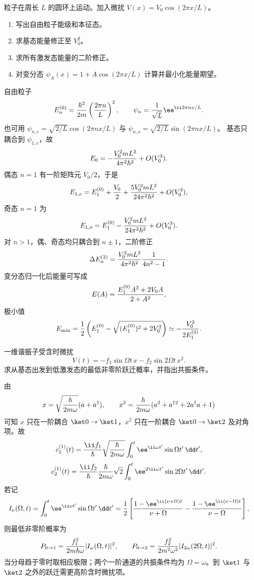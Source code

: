 
\begin{question}
粒子在周长 $L$ 的圆环上运动。加入微扰 $V(x)=V_0\cos(2\pi x/L)$。
\begin{enumerate}
  \item 写出自由粒子能级和本征态。
  \item 求基态能量修正至 $V_0^2$。
  \item 求所有激发态能量的二阶修正。
  \item 对变分态 $\psi_A(x)=1+A\cos(2\pi x/L)$ 计算并最小化能量期望。
\end{enumerate}
\begin{solution}
自由粒子
\[
  E_n^{(0)}={\hbar^2\over2m}\left({2\pi n\over L}\right)^2,\qquad
  \psi_n={1\over\sqrt L}\ee^{\ii2\pi nx/L}.
\]
也可用 $\psi_{n,e}=\sqrt{2/L}\cos(2\pi nx/L)$ 与 $\psi_{n,o}=\sqrt{2/L}\sin(2\pi nx/L)$。
基态只耦合到 $\psi_{1,e}$，故
\[
  E_0=-{V_0^2mL^2\over4\pi^2\hbar^2}+O(V_0^3).
\]
偶态 $n=1$ 有一阶矩阵元 $V_0/2$，于是
\[
  E_{1,e}=E_1^{(0)}+{V_0\over2}+{5V_0^2mL^2\over24\pi^2\hbar^2}+O(V_0^3),
\]
奇态 $n=1$ 为
\[
  E_{1,o}=E_1^{(0)}-{V_0^2mL^2\over24\pi^2\hbar^2}+O(V_0^3).
\]
对 $n>1$，偶、奇态均只耦合到 $n\pm1$，二阶修正
\[
  \Delta E_n^{(2)}={V_0^2mL^2\over4\pi^2\hbar^2}{1\over4n^2-1}.
\]
变分态归一化后能量可写成
\[
  E(A)={E_1^{(0)}A^2+2V_0A\over2+A^2},
\]
极小值
\[
  E_{\min}={1\over2}\left(E_1^{(0)}-\sqrt{(E_1^{(0)})^2+2V_0^2}\right)
  \simeq-{V_0^2\over2E_1^{(0)}}.
\]
\end{solution}
\end{question}

\begin{question}
一维谐振子受含时微扰
\[
  V(t)=-f_1\sin\Omega t\,x-f_2\sin2\Omega t\,x^2.
\]
求从基态出发到低激发态的最低非零阶跃迁概率，并指出共振条件。
\begin{solution}
由
\[
  x=\sqrt{\hbar\over2m\omega}(a+a^\dagger),\qquad
  x^2={\hbar\over2m\omega}(a^2+a^{\dagger2}+2a^\dagger a+1)
\]
可知 $x$ 只在一阶耦合 $\ket0\to\ket1$，$x^2$ 只在一阶耦合 $\ket0\to\ket2$ 及对角项。故
\[
  c_1^{(1)}(t)={\ii f_1\over\hbar}\sqrt{\hbar\over2m\omega}
  \int_0^t \ee^{\ii\omega t'}\sin\Omega t'\,\dd t',
\]
\[
  c_2^{(1)}(t)={\ii f_2\over\hbar}{\hbar\over2m\omega}\sqrt2
  \int_0^t \ee^{2\ii\omega t'}\sin2\Omega t'\,\dd t' .
\]
若记
\[
  I_\nu(\Omega,t)=\int_0^t \ee^{\ii\nu t'}\sin\Omega t'\,\dd t'
  ={1\over2}\left[
  {1-\ee^{\ii(\nu+\Omega)t}\over \nu+\Omega}
  -{1-\ee^{\ii(\nu-\Omega)t}\over \nu-\Omega}\right],
\]
则最低非零阶概率为
\[
  P_{0\to1}={f_1^2\over 2m\hbar\omega}|I_\omega(\Omega,t)|^2,\qquad
  P_{0\to2}={f_2^2\over 2m^2\omega^2}|I_{2\omega}(2\Omega,t)|^2 .
\]
当分母趋于零时取相应极限；两个一阶通道的共振条件均为
$\Omega=\omega$。到 $\ket1$ 与 $\ket2$ 之外的跃迁需更高阶含时微扰项。
\end{solution}
\end{question}


